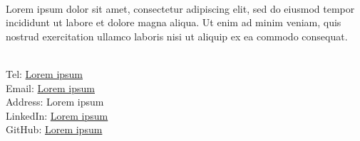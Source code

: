 \documentclass{resume_template}
\begin{document}
	\begin{tcbraster}[grid]
		\begin{tcolorbox}[header,raster multicolumn=2,borderline west={\borderwidth pt}{0pt}{white}]
		\end{tcolorbox}
		\begin{tcolorbox}[header,raster multicolumn=4,borderline east={\borderwidth pt}{0pt}{white}]
		\end{tcolorbox}
		\begin{tcolorbox}[sidebar,raster multicolumn=2]
			\justifying
			\\
				Lorem ipsum dolor sit amet, consectetur adipiscing elit, sed do eiusmod tempor incididunt ut labore et dolore magna aliqua. Ut enim ad minim veniam, quis nostrud exercitation ullamco laboris nisi ut aliquip ex ea commodo consequat.
			 		
			\\
				Tel: \href{tel:}{Lorem ipsum} \\
				Email: \href{mailto:}{Lorem ipsum} \\
				Address: Lorem ipsum \\
				LinkedIn: \href{http://www.google.com}{Lorem ipsum} \\
				GitHub: \href{http://www.google.com}{Lorem ipsum}			
				
			\\
			

\end{tcolorbox}
\end{tcbraster}
\end{document}
